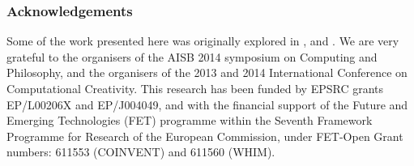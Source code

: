 \documentclass{article} %
\begin{document}




\tableofcontents

\newpage



  

% 

% 
%



\subsubsection*{Acknowledgements}
Some of the work presented here was originally explored in
\cite{colton2014acid}, \cite{colton-assessingprogress} and
\cite{pease2013discussion}.  We are very grateful to the organisers of
the AISB 2014 symposium on Computing and Philosophy, and the
organisers of the 2013 and 2014 International Conference on
Computational Creativity.  This research has been funded by EPSRC
grants EP/L00206X and EP/J004049, and with the financial support of
the Future and Emerging Technologies (FET) programme within the
Seventh Framework Programme for Research of the European Commission,
under FET-Open Grant numbers: 611553 (COINVENT) and 611560 (WHIM).





\end{document}
